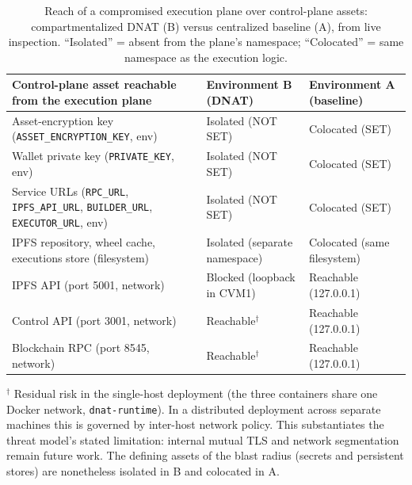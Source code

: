 \begin{table}[t]
\centering
\caption{Reach of a compromised execution plane over control-plane assets:
compartmentalized DNAT (B) versus centralized baseline (A), from live inspection.
``Isolated'' = absent from the plane's namespace; ``Colocated'' = same namespace as
the execution logic.}
\label{tab:blast-radius}
\footnotesize
\begin{tabularx}{\textwidth}{@{}Xp{3.6cm}p{3.6cm}@{}}
\toprule
Control-plane asset reachable from the execution plane & Environment B (DNAT) & Environment A (baseline) \\
\midrule
Asset-encryption key (\texttt{ASSET\_ENCRYPTION\_KEY}, env) & Isolated (NOT SET) & Colocated (SET) \\
Wallet private key (\texttt{PRIVATE\_KEY}, env) & Isolated (NOT SET) & Colocated (SET) \\
Service URLs (\texttt{RPC\_URL}, \texttt{IPFS\_API\_URL}, \texttt{BUILDER\_URL}, \texttt{EXECUTOR\_URL}, env) & Isolated (NOT SET) & Colocated (SET) \\
IPFS repository, wheel cache, executions store (filesystem) & Isolated (separate namespace) & Colocated (same filesystem) \\
IPFS API (port 5001, network) & Blocked (loopback in CVM1) & Reachable (127.0.0.1) \\
Control API (port 3001, network) & Reachable$^{\dagger}$ & Reachable (127.0.0.1) \\
Blockchain RPC (port 8545, network) & Reachable$^{\dagger}$ & Reachable (127.0.0.1) \\
\bottomrule
\end{tabularx}
\par\smallskip
{\footnotesize $^{\dagger}$ Residual risk in the single-host deployment (the three
containers share one Docker network, \texttt{dnat-runtime}). In a distributed
deployment across separate machines this is governed by inter-host network policy.
This substantiates the threat model's stated limitation: internal mutual TLS and
network segmentation remain future work. The defining assets of the blast radius
(secrets and persistent stores) are nonetheless isolated in B and colocated in A.}
\end{table}
